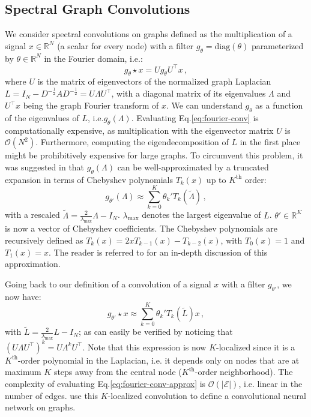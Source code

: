 \documentclass{article} %
\makeatletter
\newcommand*{\ie}{i.e.\@\xspace}
\newcommand*{\eq}{Eq.\@\xspace}
\makeatother
\begin{document}
\subsection{Spectral Graph Convolutions}
We consider spectral convolutions on graphs defined as the multiplication of a signal $x\in \mathbb{R}^N$ (a scalar for every node) with a filter $g_{\theta}=\text{diag}(\theta)$ parameterized by $\theta\in \mathbb{R}^N$ in the Fourier domain, \ie:
\begin{equation}
  g_{\theta} \star x =  Ug_{\theta}U^\top x \, ,
\label{eq:fourier-conv}
\end{equation}
where $U$ is the matrix of eigenvectors of the normalized graph Laplacian $L = I_N - D^{-\frac{1}{2}}AD^{-\frac{1}{2}} = U\Lambda U^\top$, with a diagonal matrix of its eigenvalues $\Lambda$ and $U^\top x$ being the graph Fourier transform of $x$. We can understand $g_{\theta}$ as a function of the eigenvalues of $L$, \ie $g_{\theta}(\Lambda)$. Evaluating \eq \ref{eq:fourier-conv} is computationally expensive, as multiplication with the eigenvector matrix $U$ is $\mathcal{O}(N^2)$. Furthermore, computing the eigendecomposition of $L$ in the first place might be prohibitively expensive for large graphs. To circumvent this problem, it was suggested in \cite{hammond2011wavelets} that $g_{\theta}(\Lambda)$ can be well-approximated by a truncated expansion in terms of Chebyshev polynomials $T_k(x)$ up to $K^{\text{th}}$ order:
\begin{equation}
  g_{\theta'}(\Lambda) \approx \sum_{k=0}^{K} \theta_k ' T_k(\tilde{\Lambda}) \, ,
\label{eq:tchebyshew}
\end{equation}
with a rescaled $\tilde{\Lambda}=\frac{2}{\lambda_{\text{max}}}\Lambda-I_N$. $\lambda_{\text{max}}$ denotes the largest eigenvalue of $L$. $\theta'\in \mathbb{R}^K$ is now a vector of Chebyshev coefficients. The Chebyshev polynomials are recursively defined as $T_k(x) = 2xT_{k-1}(x) - T_{k-2}(x)$, with $T_0(x)=1$ and $T_1(x)=x$. The reader is referred to \cite{hammond2011wavelets} for an in-depth discussion of this approximation.

Going back to our definition of a convolution of a signal $x$ with a filter $g_{\theta'}$, we now have:
\begin{equation}
  g_{\theta'} \star x \approx  \sum_{k=0}^{K} \theta_k' T_k(\tilde{L}) x \, ,
\label{eq:fourier-conv-approx}
\end{equation}
with $\tilde{L} = \frac{2}{\lambda_{\text{max}}}L-I_N$; as can easily be verified by noticing that $(U\Lambda U^\top)^k = U \Lambda^k U^\top$. Note that this expression is now $K$-localized since it is a $K^{\text{th}}$-order polynomial in the Laplacian, \ie it depends only on nodes that are at maximum $K$ steps away from the central node ($K^{\text{th}}$-order neighborhood). The complexity of evaluating \eq \ref{eq:fourier-conv-approx} is $\mathcal{O}(|\mathcal{E}|)$, \ie linear in the number of edges. \cite{defferrard2016convolutional} use this $K$-localized convolution to define a convolutional neural network on graphs.
\end{document}
